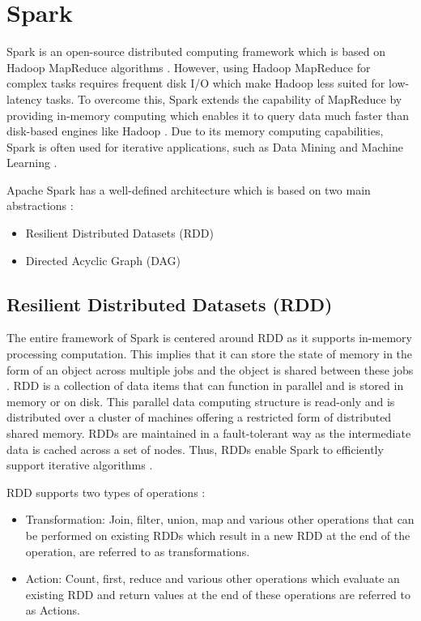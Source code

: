 \documentclass[sigconf]{acmart}
\begin{document}
\section{Spark}

Spark is an open-source distributed computing framework which is based on Hadoop MapReduce algorithms \cite{fu2016spark-p1}. However, using Hadoop MapReduce for complex tasks requires frequent disk I/O which make Hadoop less suited for low-latency tasks. To overcome this, Spark extends the capability of MapReduce by providing in-memory computing which enables it to query data much faster than disk-based engines like Hadoop \cite{spark-j1}. Due to its memory computing capabilities, Spark is often used for iterative applications, such as Data Mining and Machine Learning \cite{fu2016spark-p1}. 

Apache Spark has a well-defined architecture which is based on two main abstractions \cite{spark-a2}:
\begin{itemize}
	\item Resilient Distributed Datasets (RDD)
	\item Directed Acyclic Graph (DAG)
\end{itemize}

\subsection{Resilient Distributed Datasets (RDD)} 
The entire framework of Spark is centered around RDD as it supports in-memory processing computation. This implies that it can store the state of memory in the form of an object across multiple jobs and the object is shared between these jobs \cite{spark-j2}. RDD is a collection of data items that can function in parallel and is stored in memory or on disk. This parallel data computing structure is read-only and is distributed over a cluster of machines offering a restricted form of distributed shared memory. RDDs are maintained in a fault-tolerant way as the intermediate data is cached across a set of nodes. Thus, RDDs enable Spark to efficiently support iterative algorithms \cite{marcu2016spark-p2}.

RDD supports two types of operations \cite{spark-a3}:
\begin{itemize}
	\item Transformation: Join, filter, union, map and various other operations that can be performed on existing RDDs which result in a new RDD at the end of the operation, are referred to as transformations.
	\item Action: Count, first, reduce and various other operations which evaluate an existing RDD and return values at the end of these operations are referred to as Actions.
\end{itemize}
\end{document}
